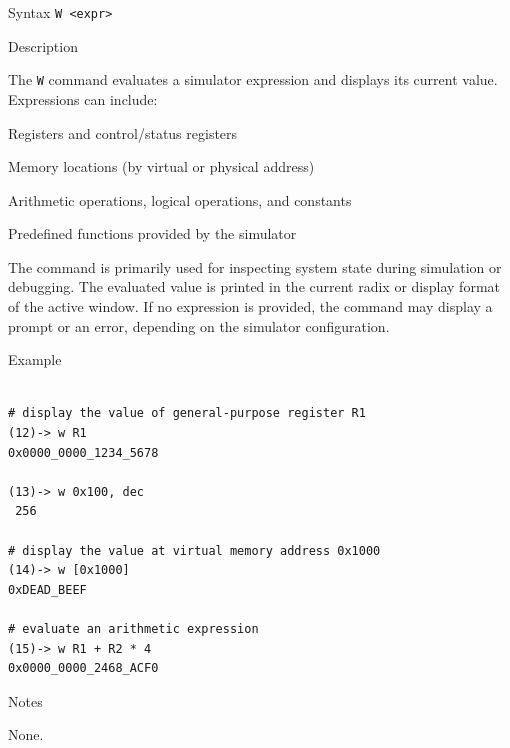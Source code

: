 %
%
\pagebreak 
{} 

\begin{iPageDescEntry}{Syntax} 
\texttt{W <expr>} \\ 
\end{iPageDescEntry}

\begin{iPageDescEntry}{Description}

The \texttt{W} command evaluates a simulator expression and displays its
current value. Expressions can include:

\begin{smallGapItemize}
  \item Registers and control/status registers
  \item Memory locations (by virtual or physical address)
  \item Arithmetic operations, logical operations, and constants
  \item Predefined functions provided by the simulator
\end{smallGapItemize}

The command is primarily used for inspecting system state during simulation
or debugging. The evaluated value is printed in the current radix or display
format of the active window. If no expression is provided, the command may
display a prompt or an error, depending on the simulator configuration.

\end{iPageDescEntry}

\begin{iPageDescOpEntry}{Example}
\begin{lstlisting}[style=iPageOpStyle]

# display the value of general-purpose register R1
(12)-> w R1
0x0000_0000_1234_5678

(13)-> w 0x100, dec
 256

# display the value at virtual memory address 0x1000
(14)-> w [0x1000]
0xDEAD_BEEF

# evaluate an arithmetic expression
(15)-> w R1 + R2 * 4
0x0000_0000_2468_ACF0

\end{lstlisting}
\end{iPageDescOpEntry}

\begin{iPageDescEntry}{Notes}

None.

\end{iPageDescEntry}
